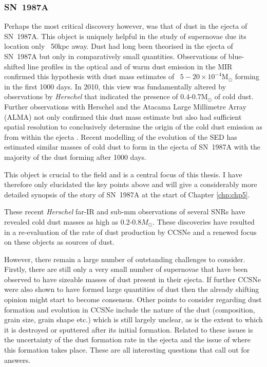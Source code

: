  \subsubsection{SN~1987A}
 
 Perhaps the most critical discovery however, was that of dust in the ejecta of SN~1987A.  This object is uniquely helpful in the study of supernovae due its location only ~50kpc away.  Dust had long been theorised in the ejecta of SN~1987A but only in comparatively small quantities.  Observations of blue-shifted line profiles in the optical and of warm dust emission in the MIR confirmed this hypothesis with dust mass estimates of ~$5-20 \times 10^{-4}$M$_{\odot}$ forming in the first 1000 days\citep{Lucy1989,Roche1989,Bouchet1991,Wooden1993,Ercolano2007}.  In 2010, this view was fundamentally altered by observations by \textit{Herschel} that indicated the presence of 0.4-0.7M$_{\odot}$ of cold dust.  Further observations with Herschel and the Atacama Large Millimetre Array (ALMA) not only confirmed this dust mass estimate but also had sufficient spatial resolution to conclusively determine the origin of the cold dust emission as from within the ejecta \citep{Matsuura2011,Indebetouw2014,Matsuura2015}.  Recent modelling of the evolution of the SED has estimated similar masses of cold dust to form in the ejecta of SN~1987A with the majority of the dust forming after 1000 days.
 
 This object is crucial to the field and is a central focus of this thesis.  I have therefore only elucidated the key points above and will give a considerably more detailed synopsis of the story of SN~1987A at the start of Chapter \ref{chp:chp5}.
 
\vspace{3ex}
\noindent These recent {\em Herschel} far-IR and sub-mm observations of several SNRs have revealed cold dust masses as high as 0.2-0.8$M_{\odot}$.  These discoveries have resulted in a re-evaluation of the rate of dust production by CCSNe and a renewed focus on these objects as sources of dust.

However, there remain a large number of outstanding challenges to consider.  Firstly, there are still only a very small number of supernovae that have been observed to have sizeable masses of dust present in their ejecta.  If further CCSNe were also shown to have formed large quantities of dust then the already shifting opinion might start to become consensus.  Other points to consider regarding dust formation and evolution in CCSNe include the nature of the dust (composition, grain size, grain shape etc.) which is still largely unclear, as is the extent to which it is destroyed or sputtered after its initial formation.  Related to these issues is the uncertainty of the dust formation rate in the ejecta and the issue of where this formation takes place.  These are all interesting questions that call out for answers.  

